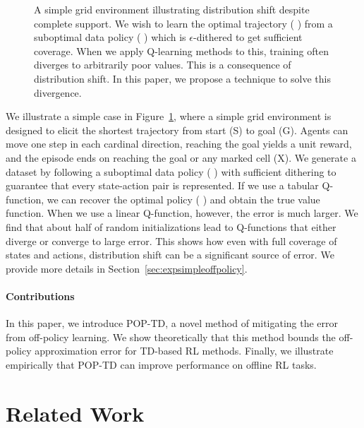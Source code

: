 \begin{figure}[t]
  \centering
  
  \caption{A simple grid environment illustrating distribution shift despite complete support. We wish to learn the optimal trajectory ({\color{optimpolicy} \optimpolicyglyph}) from a suboptimal data policy ({\color{datapolicy} \datapolicyglyph}) which is $\epsilon$-dithered to get sufficient coverage. When we apply Q-learning methods to this, training often diverges to arbitrarily poor values. This is a consequence of distribution shift. In this paper, we propose a technique to solve this divergence. }
  \label{fig:sopmap}
\end{figure}

We illustrate a simple case in Figure~\ref{fig:sopmap}, where a simple grid environment is designed to elicit the shortest trajectory from start (S) to goal (G). Agents can move one step in each cardinal direction, reaching the goal yields a unit reward, and the episode ends on reaching the goal or any marked cell (X). We generate a dataset by following a suboptimal data policy ({\color{datapolicy} \datapolicyglyph}) with sufficient dithering to guarantee that every state-action pair is represented. If we use a tabular Q-function, we can recover the optimal policy ({\color{optimpolicy} \optimpolicyglyph}) and obtain the true value function. When we use a linear Q-function, however, the error is much larger. We find that about half of random initializations lead to Q-functions that either diverge or converge to large error. This shows how even with full coverage of states and actions, distribution shift can be a significant source of error. We provide more details in Section~\ref{sec:expsimpleoffpolicy}.

\paragraph{Contributions}
In this paper, we introduce POP-TD, a novel method of mitigating the error from off-policy learning. We show theoretically that this method bounds the off-policy approximation error for TD-based RL methods. Finally, we illustrate empirically that POP-TD can improve performance on offline RL tasks.

\section{Related Work}

